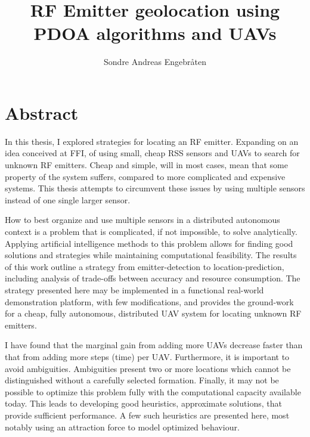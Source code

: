 \documentclass[10pt,a4paper]{book}
\author{Sondre Andreas Engebråten}
\title{RF Emitter geolocation using PDOA algorithms and UAVs}
\begin{document}


\chapter*{Abstract}

In this thesis, I explored strategies for locating an \gls{RF} emitter. Expanding on an idea conceived at \gls{FFI}, of using small, cheap \gls{RSS} sensors and \glspl{UAV} to search for unknown \gls{RF} emitters. Cheap and simple, will in most cases, mean that some property of the system suffers, compared to more complicated and expensive systems. This thesis attempts to circumvent these issues by using multiple sensors instead of one single larger sensor. 

How to best organize and use multiple sensors in a distributed autonomous context is a problem that is complicated, if not impossible, to solve analytically. Applying artificial intelligence methods to this problem allows for finding good solutions and strategies while maintaining computational feasibility. The results of this work outline a strategy from emitter-detection to location-prediction, including analysis of trade-offs between accuracy and resource consumption. The strategy presented here may be implemented in a functional real-world demonstration platform, with few modifications, and provides the ground-work for a cheap, fully autonomous, distributed \gls{UAV} system for locating unknown \gls{RF} emitters.

I have found that the marginal gain from adding more \glspl{UAV} decrease faster than that from adding more steps (time) per \gls{UAV}. Furthermore, it is important to avoid ambiguities. Ambiguities present two or more locations which cannot be distinguished without a carefully selected formation. Finally, it may not be possible to optimize this problem fully with the computational capacity available today. This leads to developing good heuristics, approximate solutions, that provide sufficient performance. A few such heuristics are presented here, most notably using an attraction force to model optimized behaviour.
\end{document}
